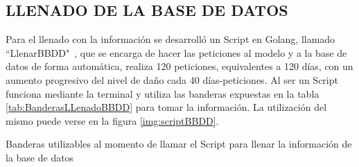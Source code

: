 \subsection{LLENADO DE LA BASE DE DATOS}
    Para el llenado con la información se desarrolló un Script en Golang,
    llamado ``LlenarBBDD"\ , que
    se encarga de hacer las peticiones al modelo y a la base de datos de forma
    automática, realiza 120 peticiones, equivalentes a 120 días, con un aumento
    progresivo del nivel de daño cada 40 días-peticiones. Al ser un Script funciona
    mediante la terminal y utiliza las banderas expuestas en la tabla
    \ref{tab:BanderasLLenadoBBDD} para tomar la información. La utilización del
    mismo puede verse en la figura \ref{img:scriptBBDD}.

\begin{table}[ht]
        \begin{center}
        \caption[Banderas Script para el llenado de la BBDD]{
        Banderas utilizables al momento de llamar el Script para llenar la información
        de la base de datos}
        \label{tab:BanderasLLenadoBBDD}


\end{center}
\end{table}
